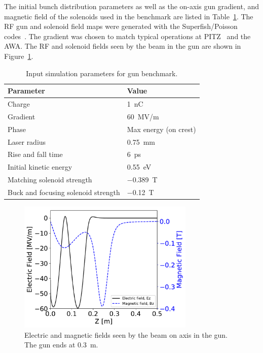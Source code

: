 The initial bunch distribution parameters as well as the 
on-axis gun gradient, and magnetic field of the solenoids used in 
the benchmark are listed in Table~\ref{tab:bench}. 
The RF gun and solenoid field maps were generated 
with the Superfish/Poisson  codes~\cite{superfish}.
The gradient was chosen to match typical operations at PITZ~\cite{pitz}
and the AWA. The RF and solenoid fields seen by the beam in the gun are shown in Figure~\ref{fig:gunfields}.
\begin{table}
	\begin{center}

		\caption{Input simulation parameters for gun benchmark.}
		\label{tab:bench}
		\begin{tabular}{l l} 
	\toprule
	\toprule
	\textbf{Parameter} & \textbf{Value} \\ 
	\midrule
	Charge  & \SI{1}{nC} \\
	Gradient & \SI{60}{MV/m} \\
	
	Phase & Max energy (on crest) \\
	
	Laser radius & \SI{0.75}{mm} \\
	
	Rise and fall time & \SI{6}{ps} \\
	
	Initial kinetic energy & \SI{0.55}{eV} \\
	
	Matching solenoid strength & \SI{-0.389}{T} \\
	
	Buck and focusing solenoid strength & \SI{-0.12}{T} \\
	\bottomrule			
\end{tabular}
	\end{center}
\end{table}
\begin{figure}
	\begin{center}
		\includegraphics[width=0.75\textwidth]{images/gun_EM_fields}
		\caption{Electric and magnetic fields seen by the beam on axis in the gun. 
			The gun ends at \SI{0.3}{m}. }
		\label{fig:gunfields}
	\end{center}
\end{figure}


